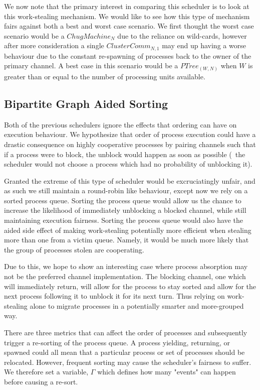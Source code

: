 We now note that the primary interest in comparing this scheduler is to look at 
this work-stealing mechanism.
We would like to see how this type of mechanism fairs against both a best and
worst case scenario. We first thought the worst case scenario would be a 
$ChugMachine_N$ due to the reliance on wild-cards, however after more 
consideration a single $ClusterComm_{N,1}$ may end up having a worse behaviour
due to the constant re-spawning of processes back to the owner of the primary
channel. A best case in this scenario would be a $PTree_{(W,N)}$ when $W$ is greater than or equal
to the number of processing units available.

\subsection{Bipartite Graph Aided Sorting}
    \label{sec:bipartite graph aided sorting}

Both of the previous schedulers ignore the effects that ordering can have on
execution behaviour. We hypothesize that order of process execution could have
a drastic consequence on highly cooperative processes by pairing channels such
that if a process were to block, the unblock would happen as soon as possible
(\ie~the scheduler would not choose a process which had no probability of
unblocking it).

Granted the extreme of this type of scheduler would be excruciatingly unfair, and
as such we still maintain a round-robin like behaviour, except now we rely on 
a sorted process queue. Sorting the process queue would allow us the chance to 
increase the likelihood of immediately unblocking a blocked channel, while still
maintaining execution fairness. 
Sorting the process queue would also have the aided side effect of making 
work-stealing potentially more efficient when stealing more than one from a 
victim queue. Namely, it would be much more likely that the group of processes
stolen are cooperating. 

Due to this, we hope to show an interesting case where process absorption may 
not be the preferred channel implementation. The blocking channel, one which will
immediately return, will allow for the process to stay sorted and allow for the 
next process following it to unblock it for its next turn. Thus relying on 
work-stealing alone to migrate processes in a potentially smarter and 
more-grouped way.

There are three metrics that can affect the order of processes and
subsequently trigger a re-sorting of the process queue. A process yielding,
returning, or spawned could all mean that a particular process or set of
processes should be relocated. However, frequent sorting may cause the
scheduler's fairness to suffer. We therefore set a variable, $\Gamma$ which
defines how many "events" can happen before causing a re-sort.

